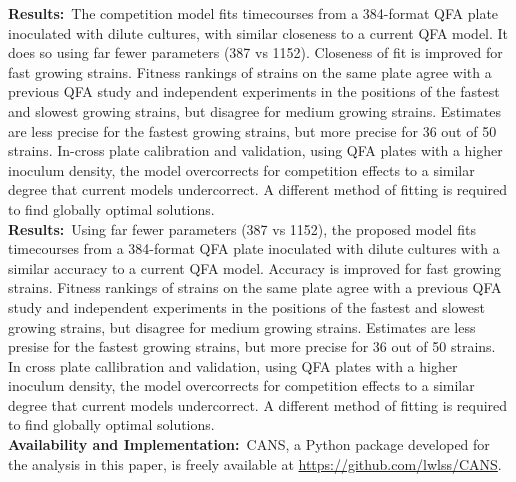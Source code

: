 \textbf{Results:}~The competition model fits timecourses from a
384-format QFA plate inoculated with dilute cultures, with similar
closeness to a current QFA model. It does so using far fewer
parameters (387 vs 1152). Closeness of fit is improved for fast
growing strains. Fitness rankings of strains on the same plate agree
with a previous QFA study and independent experiments in the positions
of the fastest and slowest growing strains, but disagree for medium
growing strains. Estimates are less precise for the fastest growing
strains, but more precise for 36 out of 50 strains. In-cross plate
calibration and validation, using QFA plates with a higher inoculum
density, the model overcorrects for competition effects to a similar
degree that current models undercorrect. A different method of fitting
is required to find globally optimal solutions.
\\

\textbf{Results:}~Using far fewer parameters (387 vs 1152), the
proposed model fits timecourses from a 384-format QFA plate inoculated
with dilute cultures with a similar accuracy to a current QFA
model. Accuracy is improved for fast growing strains. Fitness rankings
of strains on the same plate agree with a previous QFA study and
independent experiments in the positions of the fastest and slowest
growing strains, but disagree for medium growing strains. Estimates
are less presise for the fastest growing strains, but more precise for
36 out of 50 strains. In cross plate callibration and validation,
using QFA plates with a higher inoculum density, the model
overcorrects for competition effects to a similar degree that current
models undercorrect. A different method of fitting is required to find
globally optimal solutions.
\\
\textbf{Availability and Implementation:}~CANS, a Python package
developed for the analysis in this paper, is freely available at
\href{https://github.com/lwlss/CANS}{https://github.com/lwlss/CANS}.
